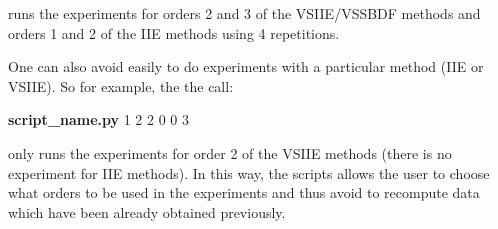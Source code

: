 \documentclass[preprint,1p]{article}
\begin{document}
\noindent runs the experiments for orders 2 and 3 of the VSIIE/VSSBDF methods and orders 1 and 2 of the IIE methods using 4 repetitions.

One can also avoid easily to do experiments with a particular method (IIE or VSIIE). So for example, the 
the call:


\begin{center}
{\bf script\_name.py} \hspace{2mm}  1 \hspace{2mm} 2 \hspace{2mm} 2 \hspace{2mm} 0 \hspace{2mm} 0 \hspace{2mm} 3 
\end{center}

\noindent only runs the experiments for order 2 of the VSIIE methods (there is no experiment for IIE methods). 
In this way, the scripts allows the user to choose what orders to be used in the experiments and thus avoid to recompute 
data which have been already obtained previously.



\end{document}

